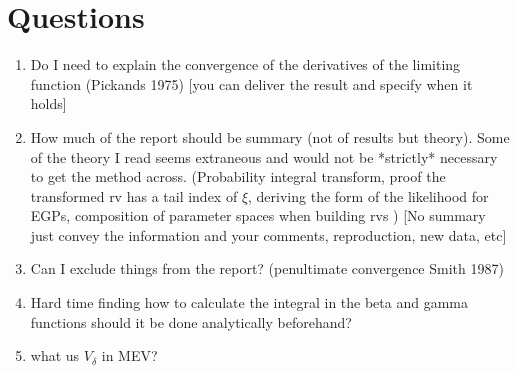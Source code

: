 \documentclass{article}
\theoremstyle{definition}
\theoremstyle{definition}
\begin{document}
\section{Questions}
\begin{enumerate}
    \item Do I need to explain the convergence of the derivatives of the limiting function (Pickands 1975) [you can deliver the result and specify when it holds]
    
    \item How much of the report should be summary (not of results but theory). Some of the theory I read seems extraneous and would not be *strictly* necessary to get the method across. (Probability integral transform, proof the transformed rv has a tail index of $\xi$, deriving the form of the likelihood for EGPs, composition of parameter spaces when building rvs )  [No summary just convey the information and your comments, reproduction, new data, etc]
    \item Can I exclude things from the report? (penultimate convergence Smith 1987)
    \item Hard time finding how to calculate the integral in the beta and gamma functions should it be done analytically beforehand?
    \item what us $V_\delta$ in MEV?
\end{enumerate}
\end{document}
